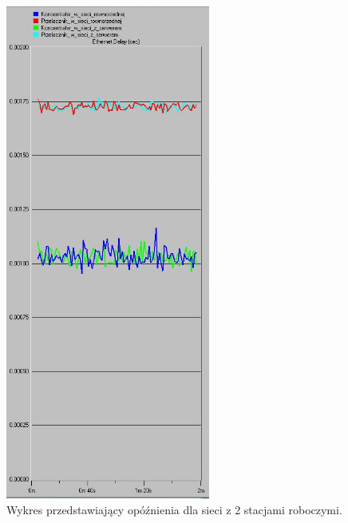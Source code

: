 \documentclass{article}
\begin{document}
\begin{figure}[H]
  \centering
  \includegraphics[width=0.60\textwidth]{screens/2_delay.png}
 \caption{Wykres przedstawiający opóźnienia dla sieci z 2 stacjami roboczymi.}
 \label{fig:2stacjed}
\end{figure}
\end{document}

